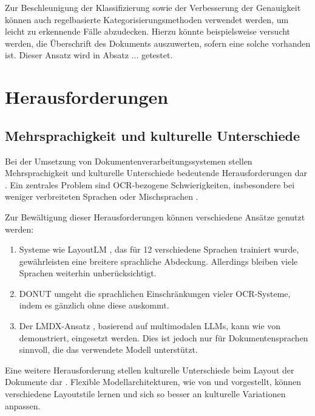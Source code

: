 Zur Beschleunigung der Klassifizierung sowie der Verbesserung der Genauigkeit können auch regelbasierte Kategorisierungsmethoden verwendet werden, um leicht zu erkennende Fälle abzudecken. Hierzu könnte beispielsweise versucht werden, die Überschrift des Dokuments auszuwerten, sofern eine solche vorhanden ist. Dieser Ansatz wird in Absatz ... getestet.

\section{Herausforderungen}
\label{sec:herausforderungen-und-offene-probleme}

\subsection{Mehrsprachigkeit und kulturelle Unterschiede}
\label{subsec:mehrsprachigkeit-und-kulturelle-unterschiede}

Bei der Umsetzung von Dokumentenverarbeitungssystemen stellen Mehrsprachigkeit und kulturelle Unterschiede bedeutende Herausforderungen dar \parencite{XuYiheng2020LPoT, SubramaniNishant2021ASoD}. Ein zentrales Problem sind \gls{OCR}-bezogene Schwierigkeiten, insbesondere bei weniger verbreiteten Sprachen oder Mischsprachen \parencite{OlejniczakKrzysztof2023TDFA}.

Zur Bewältigung dieser Herausforderungen können verschiedene Ansätze genutzt werden:

\begin{enumerate}
	\item Systeme wie LayoutLM \parencite{XuYiheng2020LPoT}, das für 12 verschiedene Sprachen trainiert wurde, gewährleisten eine breitere sprachliche Abdeckung. Allerdings bleiben viele Sprachen weiterhin unberücksichtigt.
	
	\item \gls{DONUT} \parencite{KimGeewook2022ODUT} umgeht die sprachlichen Einschränkungen vieler \gls{OCR}-Systeme, indem es gänzlich ohne diese auskommt.
	
	\item Der \gls{LMDX}-Ansatz \parencite{PerotVincent2024LLMD}, basierend auf multimodalen \glspl{LLM}, kann wie von \textcite{BiswasAnjanava2024RoSD} demonstriert, eingesetzt werden. Dies ist jedoch nur für Dokumentensprachen sinnvoll, die das verwendete Modell unterstützt.
\end{enumerate}

Eine weitere Herausforderung stellen kulturelle Unterschiede beim Layout der Dokumente dar \parencite{KimGeewook2022ODUT}. Flexible Modellarchitekturen, wie von \textcite{KimGeewook2022ODUT} und \textcite{PerotVincent2024LLMD} vorgestellt, können verschiedene Layoutstile lernen und sich so besser an kulturelle Variationen anpassen.

